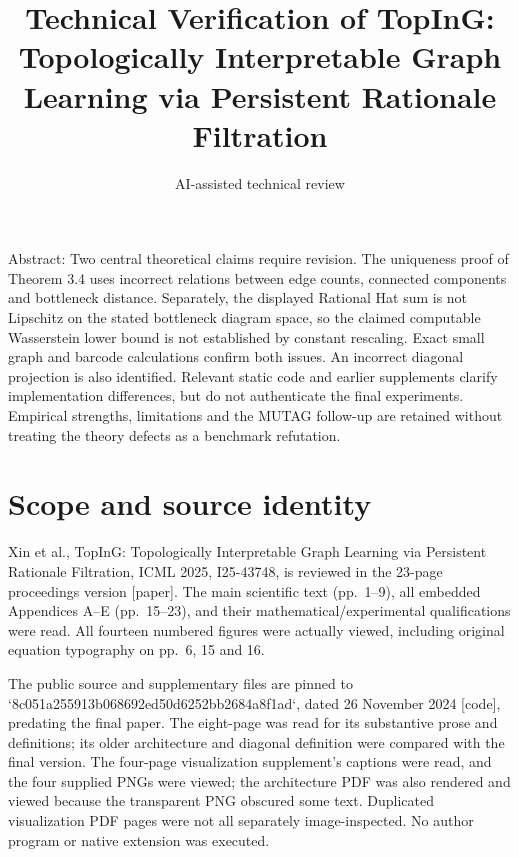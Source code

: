 \documentclass[10pt]{article}
\title{Technical Verification of
TopInG: Topologically Interpretable Graph Learning via Persistent Rationale Filtration}
\author{AI-assisted technical review}
\date{}
\begin{document}
\maketitle
Abstract: Two central theoretical claims require revision. The uniqueness proof of Theorem 3.4 uses incorrect relations between edge counts, connected components and bottleneck distance. Separately, the displayed Rational Hat sum is not Lipschitz on the stated bottleneck diagram space, so the claimed computable Wasserstein lower bound is not established by constant rescaling. Exact small graph and barcode calculations confirm both issues. An incorrect diagonal projection is also identified. Relevant static code and earlier supplements clarify implementation differences, but do not authenticate the final experiments. Empirical strengths, limitations and the MUTAG follow-up are retained without treating the theory defects as a benchmark refutation.\par
\section*{Scope and source identity}
Xin et al., TopInG: Topologically Interpretable Graph Learning via Persistent Rationale Filtration, ICML 2025, I25-43748, is reviewed in the 23-page proceedings version [paper]. The main scientific text (pp. 1–9), all embedded Appendices A–E (pp. 15–23), and their mathematical/experimental qualifications were read. All fourteen numbered figures were actually viewed, including original equation typography on pp. 6, 15 and 16.\par
The public source and supplementary files are pinned to `8c051a255913b068692ed50d6252bb2684a8f1ad`, dated 26 November 2024 [code], predating the final paper. The eight-page was read for its substantive prose and definitions; its older architecture and diagonal definition were compared with the final version. The four-page visualization supplement’s captions were read, and the four supplied PNGs were viewed; the architecture PDF was also rendered and viewed because the transparent PNG obscured some text. Duplicated visualization PDF pages were not all separately image-inspected. No author program or native extension was executed.\par
\end{document}
